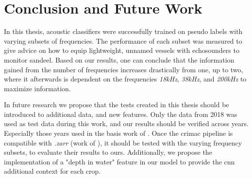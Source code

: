 \chapter{Conclusion and Future Work}
    In this thesis, acoustic classifiers were successfully trained on pseudo labels with varying subsets of frequencies. The performance of each subset was measured to give advice on how to equip lightweight, unnamed vessels with echosounders to monitor sandeel. Based on our results, one can conclude that the information gained from the number of frequencies increases drastically from one, up to two, where it afterwards is dependent on the frequencies \textit{18kHz}, \textit{38kHz}, and \textit{200kHz} to maximize information.
    
    
    

    
    In future research we propose that the tests created in this thesis should be introduced to additional data, and new features. Only the data from 2018 was used as test data during this work, and our results should be verified across years. Especially those years used in the basis work of \citeauthor{brautaset2020acoustic}. Once the \gls{crimac} pipeline is compatible with \textit{.zarr} (work of \citeauthor{brautaset2020acoustic}), it should be tested with the varying frequency subsets, to evaluate their results to ours. Additionally, we propose the implementation of a "depth in water" feature in our model to provide the \gls{cnn} additional context for each crop.
    
